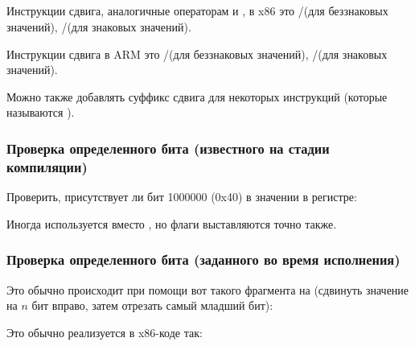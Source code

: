 ﻿%
\subsection{\Conclusion{}}

Инструкции сдвига, аналогичные операторам \CCpp \TT{$\ll$} и \TT{$\gg$}, в x86 это \SHR/\SHL (для беззнаковых значений), \SAR/\SHL (для знаковых значений).

Инструкции сдвига в ARM это \LSR/\LSL (для беззнаковых значений), \ASR/\LSL (для знаковых значений).

Можно также добавлять суффикс сдвига для некоторых инструкций 
(которые называются ).


\subsubsection{Проверка определенного бита (известного на стадии компиляции)}

Проверить, присутствует ли бит 1000000 (0x40) в значении в регистре:









Иногда \AND используется вместо \TEST, но флаги выставляются точно также.

\subsubsection{Проверка определенного бита (заданного во время исполнения)}

Это обычно происходит при помощи вот такого фрагмента на \CCpp (сдвинуть значение на $n$ бит вправо,
затем отрезать самый младший бит):



Это обычно реализуется в x86-коде так:

